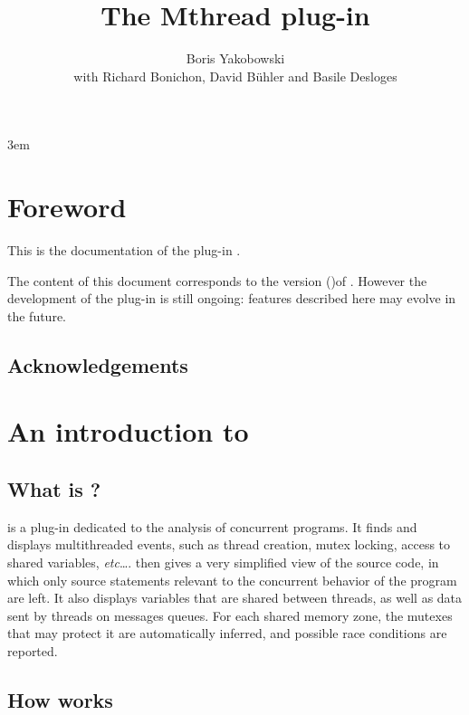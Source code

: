 \documentclass{frama-c-book}
\title{The Mthread plug-in}
\author{Boris Yakobowski \\
with Richard Bonichon, David Bühler and Basile Desloges}
\def\etc{\emph{etc}\ldots}
\newcommand{\framacversion}%
           { (\unskip)}
\begin{document}
\sloppy
\emergencystretch 3em

\maketitle
\tableofcontents


\chapter*{Foreword}
\markright{}

This is the documentation of the \FramaC plug-in \mthread.

The content of this document corresponds to the version \framacversion of \FramaC.
However the development of the \mthread plug-in is still ongoing:
features described here may evolve in the future.

\section*{Acknowledgements}

\medskip



\chapter{An introduction to \mthread}

\section{What is \mthread?}
\label{sec:mthread}

\mthread is a \FramaC plug-in dedicated to the analysis of concurrent
\C programs. It finds and displays multithreaded events,
such as thread creation, mutex
locking, access to shared variables, \etc. \mthread then gives a very
simplified view of the source code, in which only source statements
relevant to the concurrent behavior of the program are left. It also
displays variables that are shared between threads, as well as data sent by
threads on messages queues. For each shared memory zone, the mutexes
that may protect it are automatically inferred, and possible race conditions
are reported.


\section{How \mthread works}
\label{sec:mt_desc}
\end{document}
